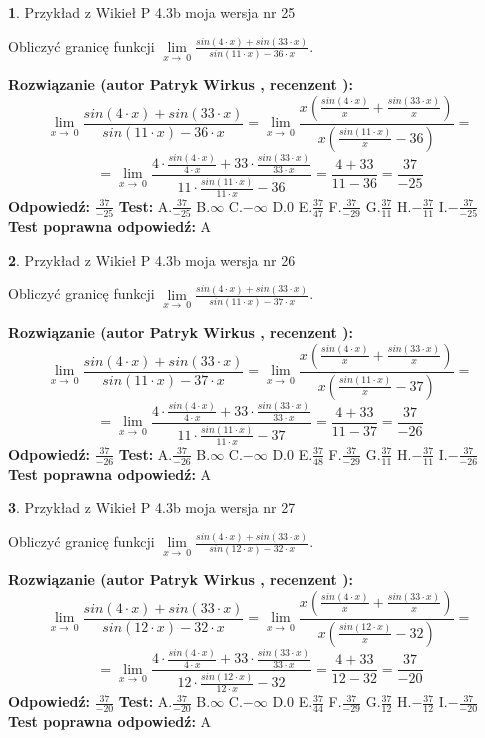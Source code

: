 \documentclass[12pt, a4paper]{article}
\theoremstyle{definition} %
\newtheorem{zad}{}
\newcommand{\zadStart}[1]{\begin{zad}#1\newline}
\newcommand{\zadStop}{\end{zad}}
\newcommand{\rozwStart}[2]{\noindent \textbf{Rozwiązanie (autor #1 , recenzent #2): }\newline}
\newcommand{\rozwStop}{\newline}
\newcommand{\odpStart}{\noindent \textbf{Odpowiedź:}\newline}
\newcommand{\odpStop}{\newline}
\newcommand{\testStart}{\noindent \textbf{Test:}\newline}
\newcommand{\testStop}{\newline}
\newcommand{\kluczStart}{\noindent \textbf{Test poprawna odpowiedź:}\newline}
\newcommand{\kluczStop}{\newline}
\begin{document}
\zadStart{Przykład z Wikieł P 4.3b moja wersja nr 25}


Obliczyć granicę funkcji $\lim\limits_{x\to\ 0}\frac{sin(4 \cdot x)+sin(33 \cdot x)}{sin(11 \cdot x)-36 \cdot x}$.
\zadStop
\rozwStart{Patryk Wirkus}{}
$$\lim\limits_{x\to\ 0}\frac{sin(4 \cdot x)+sin(33 \cdot x)}{sin(11 \cdot x)-36 \cdot x}=\lim\limits_{x\to\ 0}\frac{x(\frac{sin(4 \cdot x)}{x}+\frac{sin(33 \cdot x)}{x})}{x(\frac{sin(11 \cdot x)}{x}-36)}=$$
$$=\lim\limits_{x\to\ 0}\frac{4 \cdot \frac{sin(4 \cdot x)}{4 \cdot x}+33 \cdot \frac{sin(33 \cdot x)}{33 \cdot x}}{11 \cdot \frac{sin(11 \cdot x)}{11 \cdot x}-36}=\frac{4+33}{11-36} = \frac{37}{-25}$$
\rozwStop
\odpStart
$\frac{37}{-25}$
\odpStop
\testStart
A.$\frac{37}{-25}$
B.$\infty$
C.$-\infty$
D.$0$
E.$\frac{37}{47}$
F.$\frac{37}{-29}$
G.$\frac{37}{11}$
H.$-\frac{37}{11}$
I.$-\frac{37}{-25}$
\testStop
\kluczStart
A
\kluczStop



\zadStart{Przykład z Wikieł P 4.3b moja wersja nr 26}


Obliczyć granicę funkcji $\lim\limits_{x\to\ 0}\frac{sin(4 \cdot x)+sin(33 \cdot x)}{sin(11 \cdot x)-37 \cdot x}$.
\zadStop
\rozwStart{Patryk Wirkus}{}
$$\lim\limits_{x\to\ 0}\frac{sin(4 \cdot x)+sin(33 \cdot x)}{sin(11 \cdot x)-37 \cdot x}=\lim\limits_{x\to\ 0}\frac{x(\frac{sin(4 \cdot x)}{x}+\frac{sin(33 \cdot x)}{x})}{x(\frac{sin(11 \cdot x)}{x}-37)}=$$
$$=\lim\limits_{x\to\ 0}\frac{4 \cdot \frac{sin(4 \cdot x)}{4 \cdot x}+33 \cdot \frac{sin(33 \cdot x)}{33 \cdot x}}{11 \cdot \frac{sin(11 \cdot x)}{11 \cdot x}-37}=\frac{4+33}{11-37} = \frac{37}{-26}$$
\rozwStop
\odpStart
$\frac{37}{-26}$
\odpStop
\testStart
A.$\frac{37}{-26}$
B.$\infty$
C.$-\infty$
D.$0$
E.$\frac{37}{48}$
F.$\frac{37}{-29}$
G.$\frac{37}{11}$
H.$-\frac{37}{11}$
I.$-\frac{37}{-26}$
\testStop
\kluczStart
A
\kluczStop



\zadStart{Przykład z Wikieł P 4.3b moja wersja nr 27}


Obliczyć granicę funkcji $\lim\limits_{x\to\ 0}\frac{sin(4 \cdot x)+sin(33 \cdot x)}{sin(12 \cdot x)-32 \cdot x}$.
\zadStop
\rozwStart{Patryk Wirkus}{}
$$\lim\limits_{x\to\ 0}\frac{sin(4 \cdot x)+sin(33 \cdot x)}{sin(12 \cdot x)-32 \cdot x}=\lim\limits_{x\to\ 0}\frac{x(\frac{sin(4 \cdot x)}{x}+\frac{sin(33 \cdot x)}{x})}{x(\frac{sin(12 \cdot x)}{x}-32)}=$$
$$=\lim\limits_{x\to\ 0}\frac{4 \cdot \frac{sin(4 \cdot x)}{4 \cdot x}+33 \cdot \frac{sin(33 \cdot x)}{33 \cdot x}}{12 \cdot \frac{sin(12 \cdot x)}{12 \cdot x}-32}=\frac{4+33}{12-32} = \frac{37}{-20}$$
\rozwStop
\odpStart
$\frac{37}{-20}$
\odpStop
\testStart
A.$\frac{37}{-20}$
B.$\infty$
C.$-\infty$
D.$0$
E.$\frac{37}{44}$
F.$\frac{37}{-29}$
G.$\frac{37}{12}$
H.$-\frac{37}{12}$
I.$-\frac{37}{-20}$
\testStop
\kluczStart
A
\kluczStop
\end{document}
